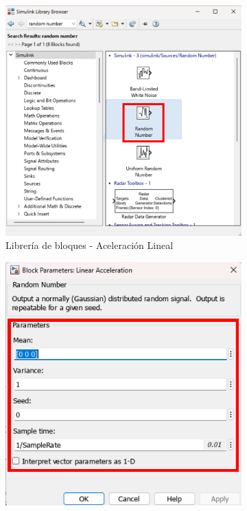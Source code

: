 \begin{figure}[htbp]
    \centering
    \begin{subfigure}[b]{0.45\textwidth}
        \centering
        \includegraphics[width=\textwidth]{fig/Capitulo5/Caso_de_estudio_IMU/Generador_de_archivos/libreria_de_bloques_aceleracion_lineal.pdf}
        \caption{Librería de bloques - Aceleración Lineal}
        \label{fig:lib_bloques_linear_acceleration}
    \end{subfigure}
    \hfill
    \begin{subfigure}[b]{0.45\textwidth}
        \centering
        \includegraphics[width=\textwidth]{fig/Capitulo5/Caso_de_estudio_IMU/Generador_de_archivos/configuracion_bloque_aceleracion_lineal.pdf}

\end{subfigure}
\end{figure}
